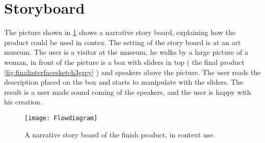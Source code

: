 \section{Storyboard}\label{sec:storyboard}
The picture shown in \ref{fig:Flowdiagram} shows a narrative story board, explaining how the product could be used in contex. The setting of the story board is at an art museum. The user is a visitor at the museum, he walks by a large picture of a woman, in front of the picture is a box with sliders in top ( the final product \ref{fig:finalinterfacesketch3grey} ) and speakers above the picture. The user reads the description placed on the box and starts to manipulate with the sliders. The result is a user made sound coming of the speakers, and the user is happy with his creation. 

\begin{figure}[!h] 
\centering
\texttt{[image: Flowdiagram]}
\caption{\label{fig:Flowdiagram} A narrative story board of the finish product,  in context use.}
\end{figure}





